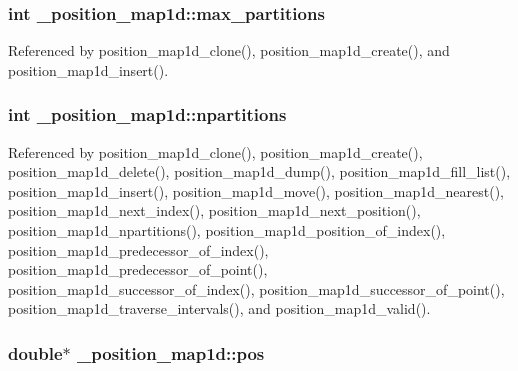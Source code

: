 \subsubsection[{\texorpdfstring{max\+\_\+partitions}{max_partitions}}]{\setlength{\rightskip}{0pt plus 5cm}int \+\_\+position\+\_\+map1d\+::max\+\_\+partitions}\hypertarget{struct__position__map1d_a4a3ba1f1a0f8c473d8d7dab7de81c16a}{}\label{struct__position__map1d_a4a3ba1f1a0f8c473d8d7dab7de81c16a}


Referenced by position\+\_\+map1d\+\_\+clone(), position\+\_\+map1d\+\_\+create(), and position\+\_\+map1d\+\_\+insert().

\subsubsection[{\texorpdfstring{npartitions}{npartitions}}]{\setlength{\rightskip}{0pt plus 5cm}int \+\_\+position\+\_\+map1d\+::npartitions}\hypertarget{struct__position__map1d_a59a27bbd2a0c5aba2f98e3d36db9e56d}{}\label{struct__position__map1d_a59a27bbd2a0c5aba2f98e3d36db9e56d}


Referenced by position\+\_\+map1d\+\_\+clone(), position\+\_\+map1d\+\_\+create(), position\+\_\+map1d\+\_\+delete(), position\+\_\+map1d\+\_\+dump(), position\+\_\+map1d\+\_\+fill\+\_\+list(), position\+\_\+map1d\+\_\+insert(), position\+\_\+map1d\+\_\+move(), position\+\_\+map1d\+\_\+nearest(), position\+\_\+map1d\+\_\+next\+\_\+index(), position\+\_\+map1d\+\_\+next\+\_\+position(), position\+\_\+map1d\+\_\+npartitions(), position\+\_\+map1d\+\_\+position\+\_\+of\+\_\+index(), position\+\_\+map1d\+\_\+predecessor\+\_\+of\+\_\+index(), position\+\_\+map1d\+\_\+predecessor\+\_\+of\+\_\+point(), position\+\_\+map1d\+\_\+successor\+\_\+of\+\_\+index(), position\+\_\+map1d\+\_\+successor\+\_\+of\+\_\+point(), position\+\_\+map1d\+\_\+traverse\+\_\+intervals(), and position\+\_\+map1d\+\_\+valid().

\subsubsection[{\texorpdfstring{pos}{pos}}]{\setlength{\rightskip}{0pt plus 5cm}double$\ast$ \+\_\+position\+\_\+map1d\+::pos}\hypertarget{struct__position__map1d_a6931615dd68687e44bf885a383b7d7db}{}\label{struct__position__map1d_a6931615dd68687e44bf885a383b7d7db}


